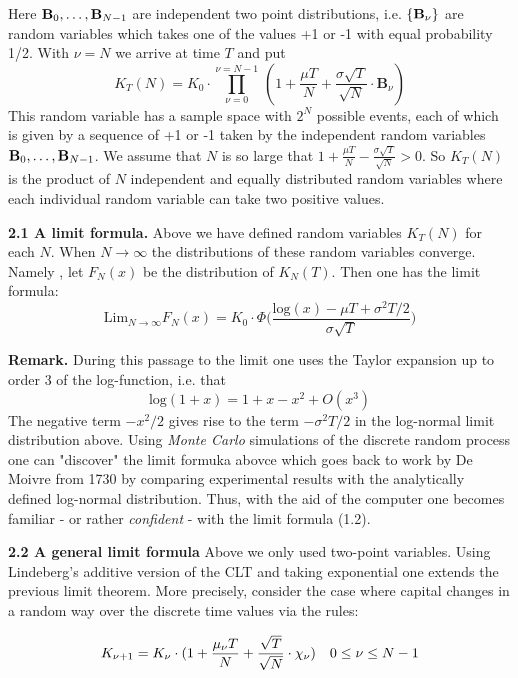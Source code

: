 \documentclass[12pt]{amsart}
\begin{document}
\noindent
Here $\bold B_0,\ldots,\bold B_{N-1}$
are independent two point distributions, i.e.
$\{\bold B_\nu\}$ are  random variables which
takes one of the values
+1 or -1 with equal probability 1/2.
With $\nu=N$ we arrive at time $T$ and put
\begin{equation}
K_T(N)=K_0\cdot \prod_{\nu=0}^{\nu=N-1}\,
(1+\frac{\mu T}{N}+
\frac{\sigma\sqrt{ T}}{\sqrt{N}}\cdot\mathbf B_\nu)
\end{equation}
This  random variable has a sample space
with 
$2^N$ possible events, each of which is given
by a sequence of +1 or -1 taken by the independent random variables
$\bold B_0,\ldots,\mathbf B_{N-1}$.
We assume that $N$ is so large that
$1+\frac{\mu T}{N}-
\frac{\sigma\sqrt{ T}}{\sqrt{N}}>0$. So
$K_T(N)$ is the product of $N$
independent  and equally distributed  random variables where 
each individual random variable can take  two 
positive values.
\bigskip

\noindent
{\bf 2.1 A limit formula.} Above we have defined
random variables $K_T(N)$ for each $N$. When
$N\to\infty$ the distributions of these random variables converge.
Namely , let $F_N(x)$ be the distribution of $K_N(T)$. 
Then one has the limit formula:
\[
\text{Lim}_{N\to\infty} F_N(x)=
K_0\cdot \Phi\bigl(\frac{\text{log}(x)-\mu T+\sigma^2T/2}
{\sigma\sqrt{T}}\bigr)\tag{1.2}
\]
\medskip

\noindent 
{\bf Remark.} 
During this passage to the limit
one uses the Taylor expansion up to order 3 of
the log-function, i.e. that 
\[
\text{log}(1+x)=1+x-x^2+O(x^3)
\]
The 
negative term 
$-x^2/2$  gives rise
to the term $-\sigma^2T/2$ in the
log-normal  limit distribution above. 
Using 
\emph{Monte Carlo} simulations of the discrete random process
one can "discover" the limit formuka abovce which goes back to
work by 
De Moivre from 1730   by comparing 
experimental results with the analytically defined log-normal distribution.
Thus, with the aid of the computer one  becomes familiar - or rather \emph{confident} -
with the limit formula (1.2).



\bigskip
 
 \noindent
{\bf 2.2  A general limit formula}
Above we only used two-point variables.
Using Lindeberg's  additive version  of the CLT and taking exponential one extends the
previous
limit theorem. More precisely,  consider 
the case where capital changes in a random way over the discrete time
values via the rules:

\[
K_{\nu+1}=K_\nu\cdot
(1+\frac{\mu_\nu T}{N}+
\frac{\sqrt{ T}}{\sqrt{N}}\cdot\bold \chi_\nu)\quad
0\leq\nu\leq N-1
\]
\end{document}
